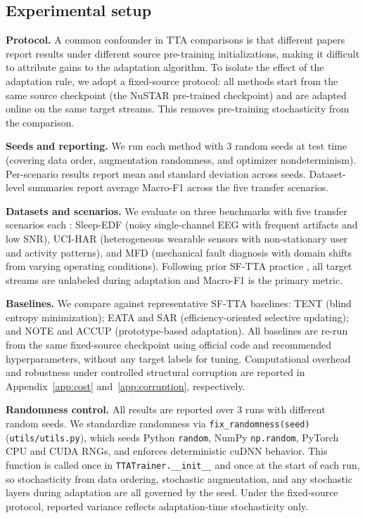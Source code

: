 \documentclass[sigconf, screen, review, anonymous]{acmart}
\theoremstyle{plain}
\theoremstyle{definition}
\theoremstyle{remark}
\begin{document}
	\subsection{Experimental setup}
	\label{sec:setup}

	\textbf{Protocol.}
	A common confounder in TTA comparisons is that different papers report results under different source pre-training initializations, making it difficult to attribute gains to the adaptation algorithm. To isolate the effect of the adaptation rule, we adopt a fixed-source protocol: all methods start from the same source checkpoint (the NuSTAR pre-trained checkpoint) and are adapted online on the same target streams. This removes pre-training stochasticity from the comparison.

	\textbf{Seeds and reporting.}
	We run each method with 3 random seeds at test time (covering data order, augmentation randomness, and optimizer nondeterminism). Per-scenario results report mean and standard deviation across seeds. Dataset-level summaries report average Macro-F1 across the five transfer scenarios.

	\textbf{Datasets and scenarios.}
	We evaluate on three benchmarks with five transfer scenarios each \citep{ragab2023adatime}: Sleep-EDF \citep{ragab2022sleep} (noisy single-channel EEG with frequent artifacts and low SNR), UCI-HAR \citep{ragab2022ucihar} (heterogeneous wearable sensors with non-stationary user and activity patterns), and MFD \citep{ragab2022mfd} (mechanical fault diagnosis with domain shifts from varying operating conditions). Following prior SF-TTA practice \citep{ragab2023adatime}, all target streams are unlabeled during adaptation and Macro-F1 is the primary metric.

	\textbf{Baselines.}
	We compare against representative SF-TTA baselines: TENT \citep{wang2021tent} (blind entropy minimization); EATA \citep{niu2022eata} and SAR \citep{niu2023sar} (efficiency-oriented selective updating); and NOTE \citep{gong2022note} and ACCUP \citep{gong2025accup} (prototype-based adaptation). All baselines are re-run from the same fixed-source checkpoint using official code and recommended hyperparameters, without any target labels for tuning. Computational overhead and robustness under controlled structural corruption are reported in Appendix~\ref{app:cost} and~\ref{app:corruption}, respectively.

	\textbf{Randomness control.}
	All results are reported over 3 runs with different random seeds. We standardize randomness via \texttt{fix\_randomness(seed)} (\texttt{utils/utils.py}), which seeds Python \texttt{random}, NumPy \texttt{np.random}, PyTorch CPU and CUDA RNGs, and enforces deterministic cuDNN behavior. This function is called once in \texttt{TTATrainer.\_\_init\_\_} and once at the start of each run, so stochasticity from data ordering, stochastic augmentation, and any stochastic layers during adaptation are all governed by the seed. Under the fixed-source protocol, reported variance reflects adaptation-time stochasticity only.
\end{document}
